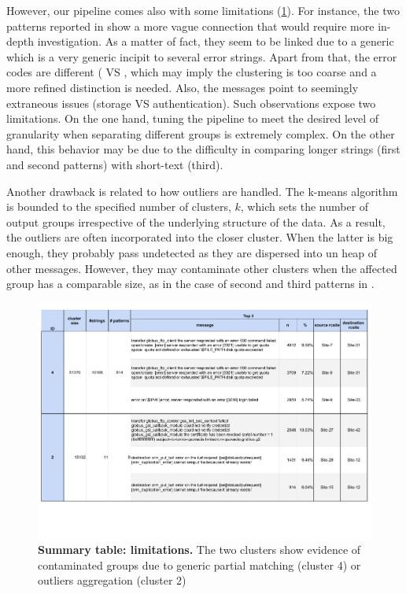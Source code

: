 However, our pipeline comes also with some limitations (\cref{fig:cluster_summary:failures}). 
For instance, the two patterns reported in  show a more vague connection that would require more in-depth investigation.
As a matter of fact, they seem to be linked due to a generic  which is a very generic incipit to several error strings. Apart from that, the error codes are different (\textbox{[3021]} VS \textbox{[3010]}, which may imply the clustering is too coarse and a more refined distinction is needed.
Also, the messages point to seemingly extraneous issues (storage VS authentication).
Such observations expose two limitations. On the one hand, tuning the pipeline to meet the desired level of granularity when separating different groups is extremely complex. 
On the other hand, this behavior may be due to the difficulty in comparing longer strings (first and second patterns) with short-text (third).

Another drawback is related to how outliers are handled. The k-means algorithm is bounded to the specified number of clusters, $k$, which sets the number of output groups irrespective of the underlying structure of the data.
As a result, the outliers are often incorporated into the closer cluster. When the latter is big enough, they probably pass undetected as they are dispersed into un heap of other messages. However, they may contaminate other clusters when the affected group has a comparable size, as in the case of second and third patterns in .

\begin{landscape}
\begin{figure}
    \centering
    \includegraphics[width=\linewidth]{figures/510_results/cluster-summary-failures.pdf}
    \caption{\textbf{Summary table: limitations.}
    The two clusters show evidence of contaminated groups due to generic partial matching (cluster 4) or outliers aggregation (cluster 2)
    }
    \label{fig:cluster_summary:failures}
\end{figure}
\end{landscape}

